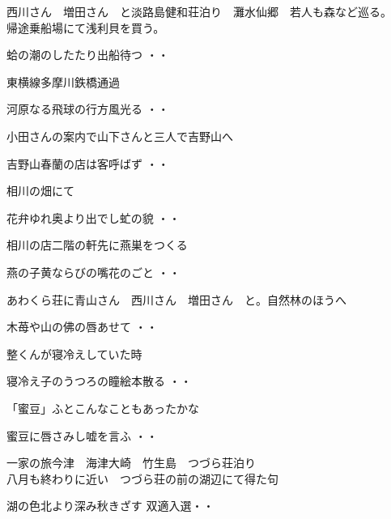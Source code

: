 西川さん　増田さん　と淡路島健和荘泊り　灘水仙郷　若人も森など巡る。\\
帰途乗船場にて浅利貝を買う。
\begin{shiika}蛤の潮のしたたり出船待つ
\hfill{・・}\end{shiika}
\vspace{0.6cm}
東横線多摩川鉄橋通過
\begin{shiika}河原なる飛球の行方風光る
\hfill{・・}\end{shiika}
\vspace{0.6cm}
小田さんの案内で山下さんと三人で吉野山へ
\begin{shiika}吉野山春蘭の店は客呼ばず
\hfill{・・}\end{shiika}
\vspace{0.6cm}
相川の畑にて
\begin{shiika}花弁ゆれ奥より出でし虻の貌
\hfill{・・}\end{shiika}
\vspace{0.6cm}
相川の店二階の軒先に燕巣をつくる
\begin{shiika}燕の子黄ならびの嘴花のごと
\hfill{・・}\end{shiika}
\vspace{0.6cm}
あわくら荘に青山さん　西川さん　増田さん　と。自然林のほうへ
\begin{shiika}木苺や山の佛の唇あせて
\hfill{・・}\end{shiika}
\vspace{0.6cm}
整くんが寝冷えしていた時
\begin{shiika}寝冷え子のうつろの瞳絵本散る
\hfill{・・}\end{shiika}
\vspace{0.6cm}
「蜜豆」ふとこんなこともあったかな
\begin{shiika}蜜豆に唇さみし嘘を言ふ
\hfill{・・}\end{shiika}
\vspace{0.6cm}
一家の旅今津　海津大崎　竹生島　つづら荘泊り\\
八月も終わりに近い　つづら荘の前の湖辺にて得た句
\begin{shiika}湖の色北より深み秋きざす
\hfill{双適入選・・}\end{shiika}

